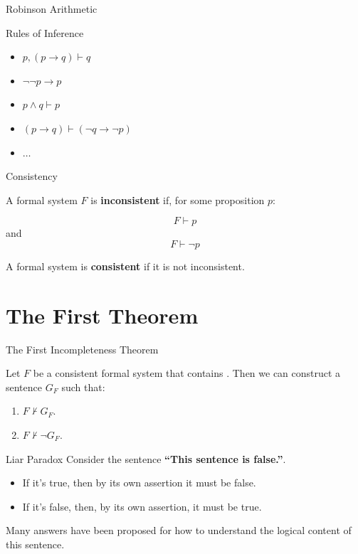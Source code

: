 \documentclass{beamer}
\begin{document}
\begin{frame}{Robinson Arithmetic}
  \begin{block}{Rules of Inference}
    \begin{itemize}
    \item[] $p, (p \rightarrow q) \vdash q$
    \item[] $\neg \neg p \rightarrow p$
    \item[] $p \land q \vdash p$
    \item[] $(p \rightarrow q) \vdash (\neg q \rightarrow \neg p)$
    \item[] $\dots$
    \end{itemize}
  \end{block}
\end{frame}

\begin{frame}{Consistency}

  A formal system $F$ is \textbf{inconsistent} if, for some proposition $p$:

  $$F \vdash p$$
  and
  $$F \vdash \neg p$$

  \pause

  A formal system is \textbf{consistent} if it is not inconsistent.

\end{frame}

\section{The First Theorem}

\begin{frame}{The First Incompleteness Theorem}
  \begin{theorem}
    Let $F$ be a consistent formal system that contains \robinson{}. Then we
    can construct a sentence $G_F$ such that:

    \begin{enumerate}
    \item $F \nvdash G_F$.
    \item $F \nvdash \neg G_F$.
    \end{enumerate}

  \end{theorem}
\end{frame}

\begin{frame}{Liar Paradox}
  Consider the sentence \textbf{``This sentence is false.''}.

  \pause

  \begin{itemize}
  \item[] If it's true, then by its own assertion it must be false. \Frowny
    \pause
  \item[] If it's false, then, by its own assertion, it must be true. \Frowny
  \end{itemize}

  \pause

  Many answers have been proposed for how to understand the logical content of
  this sentence.

\end{frame}
\end{document}
